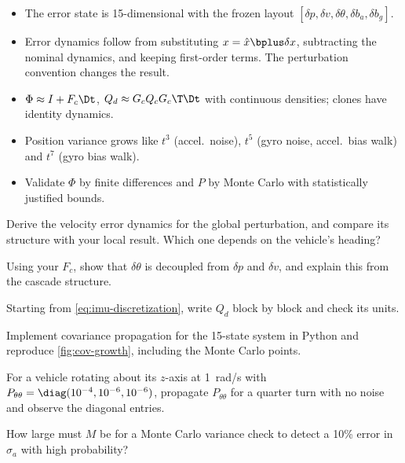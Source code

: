 \begin{takeaways}
\begin{itemize}
  \item The error state is 15-dimensional with the frozen layout $[\delta p, \delta v, \delta\theta, \delta b_a, \delta b_g]$.
  \item Error dynamics follow from substituting $x = \hat x\bplus\delta x$, subtracting the nominal dynamics, and keeping
        first-order terms. The perturbation convention changes the result.
  \item $\Phi \approx I + F_c\Dt$, $Q_d \approx G_cQ_cG_c\T\Dt$ with continuous densities; clones have identity dynamics.
  \item Position variance grows like $t^3$ (accel.\ noise), $t^5$ (gyro noise, accel.\ bias walk) and $t^7$ (gyro bias walk).
  \item Validate $\Phi$ by finite differences and $P$ by Monte Carlo with statistically justified bounds.
\end{itemize}
\end{takeaways}

\begin{exercises}
  \item Derive the velocity error dynamics for the global perturbation, and compare its structure with your local
        result. Which one depends on the vehicle's heading?
  \item Using your $F_c$, show that $\delta\theta$ is decoupled from $\delta p$ and $\delta v$, and explain this from the cascade structure.
  \item Starting from \eqref{eq:imu-discretization}, write $Q_d$ block by block and check its units.
  \item Implement covariance propagation for the 15-state system in Python and reproduce \cref{fig:cov-growth}, including
        the Monte Carlo points.
  \item For a vehicle rotating about its $z$-axis at 1~rad/s with $P_{\theta\theta} = \diag(10^{-4}, 10^{-6}, 10^{-6})$, propagate
        $P_{\theta\theta}$ for a quarter turn with no noise and observe the diagonal entries.
  \item How large must $M$ be for a Monte Carlo variance check to detect a 10\% error in $\sigma_a$ with high probability?
\end{exercises}
